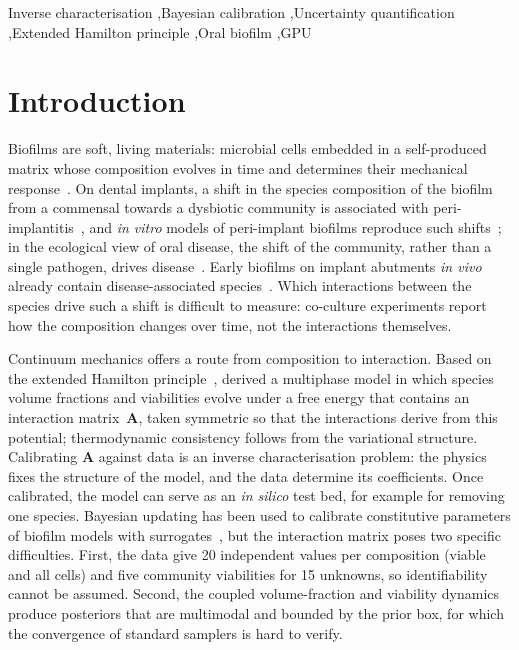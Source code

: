 \documentclass[preprint,12pt]{elsarticle}
\begin{document}
\begin{frontmatter}
\begin{keyword}
Inverse characterisation \sep Bayesian calibration \sep Uncertainty quantification \sep Extended Hamilton principle \sep Oral biofilm \sep GPU
\end{keyword}

\end{frontmatter}

\section{Introduction}
\label{sec:intro}

Biofilms are soft, living materials: microbial cells embedded in a self-produced matrix whose composition evolves in time and determines their mechanical response~\citep{Klempt2024ContinuumGrowth}.
On dental implants, a shift in the species composition of the biofilm from a commensal towards a dysbiotic community is associated with peri-implantitis~\citep{Szafranski2026Periimplant,Ghensi2020Implant}, and \textit{in vitro} models of peri-implant biofilms reproduce such shifts~\citep{heine2025influence}; in the ecological view of oral disease, the shift of the community, rather than a single pathogen, drives disease~\citep{Marsh2003Dental}.
Early biofilms on implant abutments \textit{in vivo} already contain disease-associated species~\citep{dieckow2024structure}.
Which interactions between the species drive such a shift is difficult to measure: co-culture experiments report how the composition changes over time, not the interactions themselves.

Continuum mechanics offers a route from composition to interaction.
Based on the extended Hamilton principle~\citep{JunkerBalzani2021ExtendedHamilton}, \citet{Klempt2025ContinuumBiofilm} derived a multiphase model in which species volume fractions and viabilities evolve under a free energy that contains an interaction matrix~$\mathbf{A}$, taken symmetric so that the interactions derive from this potential; thermodynamic consistency follows from the variational structure.
Calibrating $\mathbf{A}$ against data is an inverse characterisation problem: the physics fixes the structure of the model, and the data determine its coefficients.
Once calibrated, the model can serve as an \textit{in silico} test bed, for example for removing one species.
Bayesian updating has been used to calibrate constitutive parameters of biofilm models with surrogates~\citep{Fritsch2025BayesianMicrofilms}, but the interaction matrix poses two specific difficulties.
First, the data give 20 independent values per composition (viable and all cells) and five community viabilities for 15 unknowns, so identifiability cannot be assumed.
Second, the coupled volume-fraction and viability dynamics produce posteriors that are multimodal and bounded by the prior box, for which the convergence of standard samplers is hard to verify.
\end{document}
